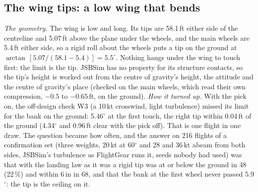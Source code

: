 \documentclass[10pt,a4paper,twocolumn]{article}
\begin{document}
\subsection{The wing tips: a low wing that bends}\label{sec:tips}
\emph{The geometry.} The wing is low and long. Its tips are 58.1\,ft either side of the centreline and 5.07\,ft above the plane under the wheels, and the main wheels are 5.4\,ft either side, so a rigid roll about the wheels puts a tip
on the ground at $\arctan\,[5.07/(58.1-5.4)]=5.5^\circ$. Nothing hangs under the wing to touch first: the limit is the tip. JSBSim has no property for its structure contacts, so the tip's height is worked out from the centre of gravity's height,
the attitude and the centre of gravity's place (checked on the main wheels, which read their own compression, $-0.5$ to $-0.65$\,ft, on the ground). \emph{How it turned up.} With the pick on, the off-design check W3 (a 10\,kt crosswind, light turbulence)
missed its limit for the bank on the ground: 5.46$^\circ$ at the first touch, the right tip within 0.04\,ft of the ground (4.34$^\circ$ and 0.96\,ft clear with the pick off). That is one flight in one draw. The question became how often, and the
answer on 216 flights of a confirmation set (three weights, 20\,kt at 60$^\circ$ and 28 and 36\,kt abeam from both sides, JSBSim's turbulence as FlightGear runs it, seeds nobody had used) was that with the landing law as it was a rigid tip was at or below the ground in 48
(22\,\%) and within 6\,in in 68, and that the bank at the first wheel never passed 5.9$^\circ$: the tip is the ceiling on it.
\end{document}
